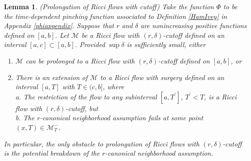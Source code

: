 \documentclass[12pt]{amsart}
\newcommand{\M}{{\mathcal M}}
\newcommand{\de}{\delta}
\numberwithin{equation}{section}
\theoremstyle{plain}
\newtheorem{lemma}[equation]{Lemma}
\theoremstyle{definition}
\theoremstyle{remark}
\begin{document}
\begin{lemma}(Prolongation of Ricci flows with cutoff)
\label{extendit}
Take the function $\Phi$  to be the time-dependent pinching
function  associated to 
Definition \ref{HamIvey}
in Appendix \ref{phiappendix}.
Suppose that $r$ and $\de$ are nonincreasing positive functions
defined on $[a,b]$. Let $\M$ be a Ricci flow with
$(r, \de)$-cutoff defined on an interval $[a,c]\subset [a,b]$.
Provided $\sup\de$ is sufficiently small, either 
\begin{enumerate}
\item $\M$ can be prolonged to a Ricci flow with
$(r, \de)$-cutoff defined on $[a,b]$, or
\item There is an extension of $\M$ to a Ricci flow with 
surgery
defined  on an interval $[a,T]$ with $T \in (c, b]$, where \\
a. The restriction of  the flow to any subinterval $[a, T^\prime]$,
$T^\prime < T$,
is a Ricci flow with $(r, \de)$-cutoff, but\\
b. The $r$-canonical neighborhood assumption fails at some
point $(x,T)\in \M_T^-$.
\end{enumerate}
In particular, the only obstacle to prolongation of Ricci
flows with $(r,\de)$-cutoff is the potential breakdown of the
$r$-canonical neighborhood assumption.
\end{lemma}
\end{document}
